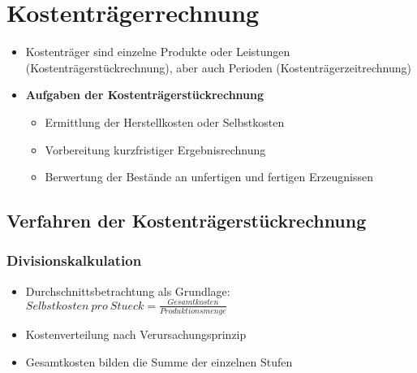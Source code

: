 \section{Kostenträgerrechnung}
\begin{itemize}
	\item Kostenträger sind einzelne Produkte oder Leistungen (Kostenträgerstückrechnung), aber auch Perioden (Kostenträgerzeitrechnung)
	\item \textbf{Aufgaben der Kostenträgerstückrechnung}
	\begin{itemize}
		\item Ermittlung der Herstellkosten oder Selbstkosten
		\item Vorbereitung kurzfristiger Ergebnisrechnung
		\item Berwertung der Bestände an unfertigen und fertigen Erzeugnissen
	\end{itemize}
\end{itemize}


\subsection{Verfahren der Kostenträgerstückrechnung}

\subsubsection{Divisionskalkulation}
\begin{itemize}
	\item Durchschnittsbetrachtung als Grundlage: \(Selbstkosten~pro~Stueck=\frac{Gesamtkosten}{Produktionsmenge}\)
	\item Kostenverteilung nach Verursachungsprinzip
	\item Gesamtkosten bilden die Summe der einzelnen Stufen
\end{itemize}

